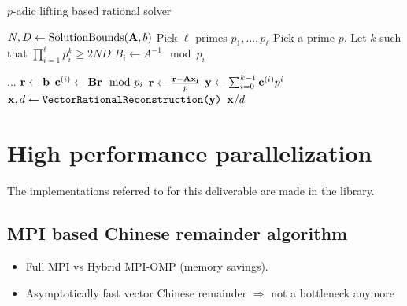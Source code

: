\begin{algorithm}[htb]
  \caption{$p$-adic lifting based rational solver}
  \begin{algorithmic}[1]
    \State $N,D \leftarrow \text{SolutionBounds}(\mathbf{A},b)$
    \State Pick $\ell$ primes $p_1,\dots, p_\ell$
    \State Pick a prime $p$. Let $k$ such that $\prod_{i=1}^\ell p_i^k \geq 2ND$
      \State $B_i \leftarrow  A^{-1} \mod p_i$
    \EndFor

    \State ...
    \State $\mathbf{r}\leftarrow \mathbf{b}$
    \State $\mathbf{c}^{(i)}  \leftarrow \mathbf{B} \mathbf{r} \mod p_i$
    \State $\mathbf{r} \leftarrow  \frac{\mathbf{r} - \mathbf{A}\mathbf{x_i}}{p}$
    \EndFor
    \State $\mathbf{y} \leftarrow \sum_{i=0}^{k-1} \mathbf{c}^{(i)} p^i$
    \State $\mathbf{x},d\leftarrow \texttt{VectorRationalReconstruction(\ensuremath{\mathbf{y}})}$
  \State \Return $\mathbf{x}/d$
\end{algorithmic}
\end{algorithm}

\section{High performance parallelization}

The implementations referred to for this deliverable are made in the \Linbox library.


\subsection{MPI based Chinese remainder algorithm}

\begin{itemize}
\item  Full MPI vs Hybrid MPI-OMP (memory savings).
\item Asymptotically fast vector Chinese remainder $\Rightarrow$ not a bottleneck anymore
\end{itemize}



